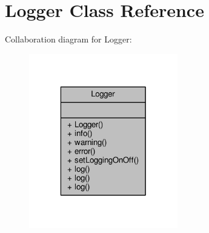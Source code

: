 \hypertarget{classLogger}{\section{Logger Class Reference}
\label{classLogger}
}


Collaboration diagram for Logger\-:
\nopagebreak
\begin{figure}[H]
\begin{center}
\leavevmode
\includegraphics[width=184pt]{classLogger__coll__graph}
\end{center}
\end{figure}
